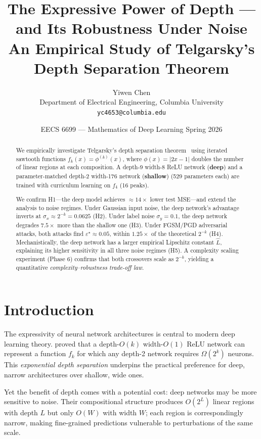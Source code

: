 \documentclass[10pt,twocolumn]{article}
\title{\textbf{The Expressive Power of Depth — and Its Robustness Under Noise}\\[4pt]
  \large An Empirical Study of Telgarsky's Depth Separation Theorem}
\author{Yiwen Chen\\
  Department of Electrical Engineering, Columbia University\\
  \texttt{yc4653@columbia.edu}}
\date{EECS 6699 — Mathematics of Deep Learning \quad Spring 2026}
\newcommand{\Lip}{\hat{L}}
\newcommand{\sigx}{\sigma_x}
\newcommand{\sigy}{\sigma_y}
\newcommand{\epst}{\varepsilon^\star}
\begin{document}
\maketitle

\begin{abstract}
We empirically investigate Telgarsky's depth separation theorem~\citep{telgarsky2016benefits}
using iterated sawtooth functions $f_k(x) = \phi^{(k)}(x)$, where $\phi(x)=|2x-1|$ doubles
the number of linear regions at each composition.  A depth-9 width-8 ReLU network
(\textbf{deep}) and a parameter-matched depth-2 width-176 network (\textbf{shallow})
(529 parameters each) are trained with curriculum learning on $f_4$ (16 peaks).

We confirm H1—the deep model achieves $\approx\!14\times$ lower test MSE—and
extend the analysis to noise regimes.  Under Gaussian input noise, the deep network's
advantage inverts at $\sigx \approx 2^{-k} = 0.0625$ (H2).  Under label noise
$\sigy = 0.1$, the deep network degrades $7.5\times$ more than the shallow one (H3).
Under FGSM/PGD adversarial attacks, both attacks find $\epst \approx 0.05$, within
$1.25\times$ of the theoretical $2^{-k}$ (H4).  Mechanistically, the deep network
has a larger empirical Lipschitz constant $\Lip$, explaining its higher sensitivity
in all three noise regimes (H5).  A complexity scaling experiment (Phase 6) confirms
that both crossovers scale as $2^{-k}$, yielding a quantitative
\emph{complexity–robustness trade-off law}.
\end{abstract}

\section{Introduction}
\label{sec:intro}

The expressivity of neural network architectures is central to modern deep learning theory.
\citet{telgarsky2016benefits} proved that a depth-$O(k)$ width-$O(1)$ ReLU network can
represent a function $f_k$ for which any depth-2 network requires $\Omega(2^k)$ neurons.
This \emph{exponential depth separation} underpins the practical preference for deep,
narrow architectures over shallow, wide ones.

Yet the benefit of depth comes with a potential cost: deep networks may be more
sensitive to noise. Their compositional structure produces $O(2^L)$ linear regions with
depth $L$ but only $O(W)$ with width $W$; each region is correspondingly narrow, making
fine-grained predictions vulnerable to perturbations of the same scale.
\end{document}
